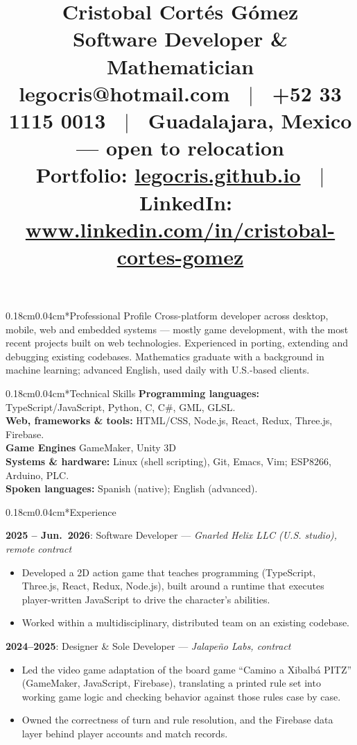\documentclass[10.5pt]{article}
\title{\vspace{-1.5cm} \Huge{Cristobal Cortés Gómez} \\ \large{Software Developer \& Mathematician} \\
\vspace{0.25cm}
\normalsize{
legocris@hotmail.com \ $|$ \ +52 33 1115 0013 \ $|$ \ Guadalajara, Mexico --- open to relocation \\
Portfolio: \url{legocris.github.io} \ $|$ \ LinkedIn: \url{www.linkedin.com/in/cristobal-cortes-gomez}
}
\vspace{-1cm}}
\author{}
\date{}
\makeatletter
\renewcommand{\section}{\@startsection{section}{1}{0pt}%
  {0.18cm}{0.04cm}{\normalfont\large\bfseries}}
\makeatother
\begin{document}
\pagestyle{empty}

\maketitle
\thispagestyle{empty}

\section*{Professional Profile}
Cross-platform developer across desktop, mobile, web and embedded systems --- mostly game development, with the most recent projects built on web technologies. Experienced in porting, extending and debugging existing codebases. Mathematics graduate with a background in machine learning; advanced English, used daily with U.S.-based clients.

\section*{Technical Skills}
\textbf{Programming languages:} TypeScript/JavaScript, Python, C, C\#, GML, GLSL. \\
\textbf{Web, frameworks \& tools:} HTML/CSS, Node.js, React, Redux, Three.js, Firebase. \\
\textbf{Game Engines}  GameMaker, Unity 3D \\
\textbf{Systems \& hardware:} Linux (shell scripting), Git, Emacs, Vim; ESP8266, Arduino, PLC. \\
\textbf{Spoken languages:} Spanish (native); English (advanced).

\section*{Experience}

\textbf{2025 -- Jun.\ 2026}: Software Developer --- \textit{Gnarled Helix LLC (U.S. studio), remote contract}
\begin{itemize}
    \item Developed a 2D action game that teaches programming (TypeScript, Three.js, React, Redux, Node.js), built around a runtime that executes player-written JavaScript to drive the character's abilities.
    \item Worked within a multidisciplinary, distributed team on an existing codebase.
\end{itemize}

\textbf{2024--2025}: Designer \& Sole Developer --- \textit{Jalapeño Labs, contract}
\begin{itemize}
    \item Led the video game adaptation of the board game ``Camino a Xibalbá PITZ'' (GameMaker, JavaScript, Firebase), translating a printed rule set into working game logic and checking behavior against those rules case by case.
    \item Owned the correctness of turn and rule resolution, and the Firebase data layer behind player accounts and match records.
\end{itemize}
\end{document}
